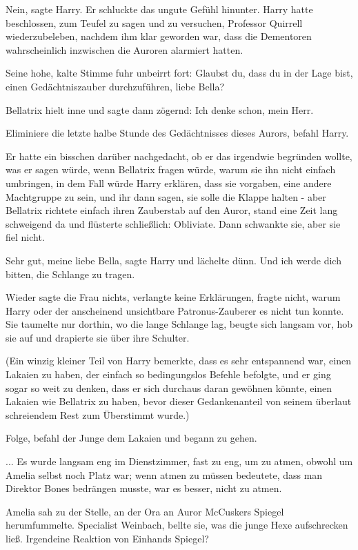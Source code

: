 \glqq{}Nein\grqq{}, sagte Harry. Er schluckte das ungute Gefühl hinunter. Harry
hatte beschlossen, zum Teufel zu sagen und zu versuchen, Professor Quirrell
wiederzubeleben, nachdem ihm klar geworden war, dass die Dementoren
wahrscheinlich inzwischen die Auroren alarmiert hatten.

Seine hohe, kalte Stimme fuhr unbeirrt fort: \glqq{}Glaubst du, dass du in der
Lage bist, einen Gedächtniszauber durchzuführen, liebe Bella?\grqq{}

Bellatrix hielt inne und sagte dann zögernd: \glqq{}Ich denke schon, mein Herr.\grqq{}

\glqq{}Eliminiere die letzte halbe Stunde des Gedächtnisses dieses Aurors\grqq{},
befahl Harry.

Er hatte ein bisschen darüber nachgedacht, ob er das irgendwie begründen wollte,
was er sagen würde, wenn Bellatrix fragen würde, warum sie ihn nicht einfach
umbringen, in dem Fall würde Harry erklären, dass sie vorgaben, eine andere
Machtgruppe zu sein, und ihr dann sagen, sie solle die Klappe halten - aber
Bellatrix richtete einfach ihren Zauberstab auf den Auror, stand eine Zeit lang
schweigend da und flüsterte schließlich: \glqq{}Obliviate.\grqq{} Dann schwankte
sie, aber sie fiel nicht.

\glqq{}Sehr gut, meine liebe Bella\grqq{}, sagte Harry und lächelte dünn. \glqq{}
Und ich werde dich bitten, die Schlange zu tragen.\grqq{}

Wieder sagte die Frau nichts, verlangte keine Erklärungen, fragte nicht, warum
Harry oder der anscheinend unsichtbare Patronus-Zauberer es nicht tun konnte.
Sie taumelte nur dorthin, wo die lange Schlange lag, beugte sich langsam vor,
hob sie auf und drapierte sie über ihre Schulter.

(Ein winzig kleiner Teil von Harry bemerkte, dass es sehr entspannend war, einen
Lakaien zu haben, der einfach so bedingungslos Befehle befolgte, und er ging
sogar so weit zu denken, dass er sich durchaus daran gewöhnen könnte, einen
Lakaien wie Bellatrix zu haben, bevor dieser Gedankenanteil von seinem überlaut
schreiendem Rest zum Überstimmt wurde.)

\glqq{}Folge\grqq{}, befahl der Junge dem Lakaien und begann zu gehen.

... Es wurde langsam eng im Dienstzimmer, fast zu eng, um zu atmen, obwohl um
Amelia selbst noch Platz war; wenn atmen zu müssen bedeutete, dass man Direktor
Bones bedrängen musste, war es besser, nicht zu atmen.

Amelia sah zu der Stelle, an der Ora an Auror McCuskers Spiegel herumfummelte.
\glqq{}Specialist Weinbach\grqq{}, bellte sie, was die junge Hexe aufschrecken
ließ. \glqq{}Irgendeine Reaktion von Einhands Spiegel?\grqq{}

